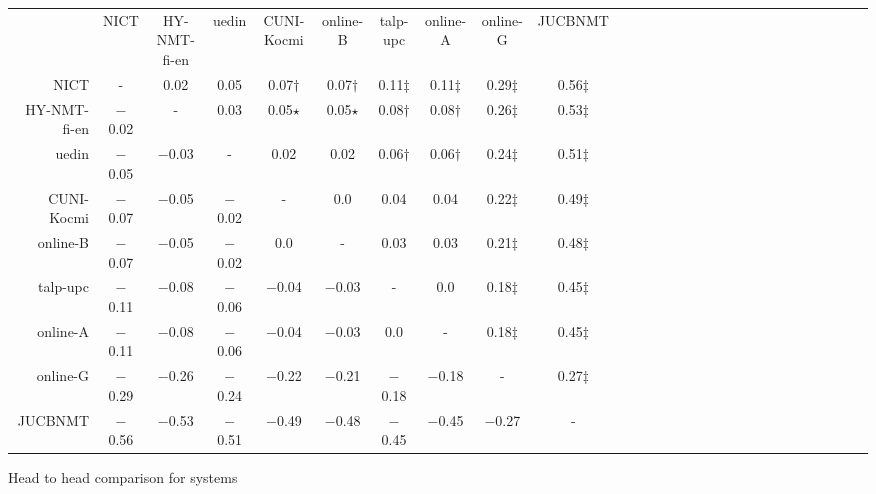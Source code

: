\begin{tabular}{rccccccccccccccccccccccccccc}

 & NICT & HY-NMT-fi-en & uedin & CUNI-Kocmi & online-B & talp-upc & online-A & online-G & JUCBNMT \\ 
NICT & - &    0.02 &    0.05 &    0.07$\dagger$ &    0.07$\dagger$ &    0.11$\ddagger$ &    0.11$\ddagger$ &    0.29$\ddagger$ &    0.56$\ddagger$ \\ 
HY-NMT-fi-en & $-$0.02 & - &    0.03 &    0.05$\star$ &    0.05$\star$ &    0.08$\dagger$ &    0.08$\dagger$ &    0.26$\ddagger$ &    0.53$\ddagger$ \\ 
uedin & $-$0.05 & $-$0.03 & - &    0.02 &    0.02 &    0.06$\dagger$ &    0.06$\dagger$ &    0.24$\ddagger$ &    0.51$\ddagger$ \\ 
CUNI-Kocmi & $-$0.07 & $-$0.05 & $-$0.02 & - &    0.0 &    0.04 &    0.04 &    0.22$\ddagger$ &    0.49$\ddagger$ \\ 
online-B & $-$0.07 & $-$0.05 & $-$0.02 &    0.0 & - &    0.03 &    0.03 &    0.21$\ddagger$ &    0.48$\ddagger$ \\ 
talp-upc & $-$0.11 & $-$0.08 & $-$0.06 & $-$0.04 & $-$0.03 & - &    0.0 &    0.18$\ddagger$ &    0.45$\ddagger$ \\ 
online-A & $-$0.11 & $-$0.08 & $-$0.06 & $-$0.04 & $-$0.03 &    0.0 & - &    0.18$\ddagger$ &    0.45$\ddagger$ \\ 
online-G & $-$0.29 & $-$0.26 & $-$0.24 & $-$0.22 & $-$0.21 & $-$0.18 & $-$0.18 & - &    0.27$\ddagger$ \\ 
JUCBNMT & $-$0.56 & $-$0.53 & $-$0.51 & $-$0.49 & $-$0.48 & $-$0.45 & $-$0.45 & $-$0.27 & - \\ 


\end{tabular}
\caption{Head to head comparison for \FIen systems}
\label{pairwise-fien}


